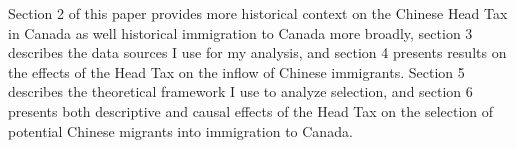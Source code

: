 






Section 2 of this paper provides more historical context on the Chinese Head Tax in Canada as well historical immigration to Canada more broadly, section 3 describes the data sources I use for my analysis, and section 4 presents results on the effects of the Head Tax on the inflow of Chinese immigrants. Section 5 describes the theoretical framework I use to analyze selection, and section 6 presents both descriptive and causal effects of the Head Tax on the selection of potential Chinese migrants into immigration to Canada.
